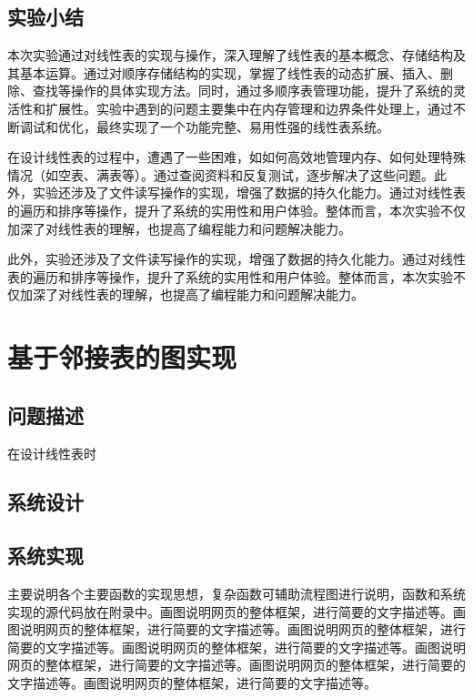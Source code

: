 \documentclass[supercite]{Experimental_Report}
\theoremstyle{definition}
\begin{document}
\subsection{实验小结}

本次实验通过对线性表的实现与操作，深入理解了线性表的基本概念、存储结构及其基本运算。通过对顺序存储结构的实现，掌握了线性表的动态扩展、插入、删除、查找等操作的具体实现方法。同时，通过多顺序表管理功能，提升了系统的灵活性和扩展性。实验中遇到的问题主要集中在内存管理和边界条件处理上，通过不断调试和优化，最终实现了一个功能完整、易用性强的线性表系统。

在设计线性表的过程中，遭遇了一些困难，如如何高效地管理内存、如何处理特殊情况（如空表、满表等）。通过查阅资料和反复测试，逐步解决了这些问题。此外，实验还涉及了文件读写操作的实现，增强了数据的持久化能力。通过对线性表的遍历和排序等操作，提升了系统的实用性和用户体验。整体而言，本次实验不仅加深了对线性表的理解，也提高了编程能力和问题解决能力。

此外，实验还涉及了文件读写操作的实现，增强了数据的持久化能力。通过对线性表的遍历和排序等操作，提升了系统的实用性和用户体验。整体而言，本次实验不仅加深了对线性表的理解，也提高了编程能力和问题解决能力。



\newpage

\section{基于邻接表的图实现}

\subsection{问题描述}

在设计线性表时\cite{baf96}

\subsection{系统设计}


\subsection{系统实现}

主要说明各个主要函数的实现思想，复杂函数可辅助流程图进行说明，函数和系统实现的源代码放在附录中。画图说明网页的整体框架，进行简要的文字描述等。画图说明网页的整体框架，进行简要的文字描述等。画图说明网页的整体框架，进行简要的文字描述等。画图说明网页的整体框架，进行简要的文字描述等。画图说明网页的整体框架，进行简要的文字描述等。画图说明网页的整体框架，进行简要的文字描述等。画图说明网页的整体框架，进行简要的文字描述等。
\end{document}
